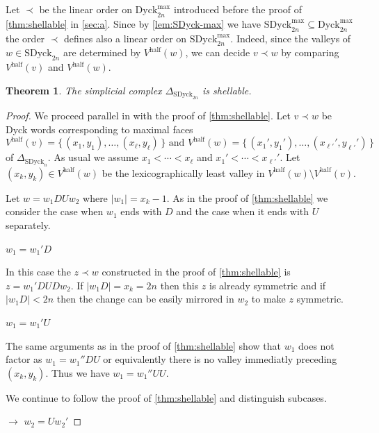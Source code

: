 \documentclass[11pt]{amsart}
\def\Dyck{\mathrm{Dyck}}
\def\half{\mathrm{half}}
\def\SDyck{\mathrm{SDyck}}
\theoremstyle{plain}
\numberwithin{lemma}{\DefaultNumberTheoremWithin}
\newtheorem{theorem}{Theorem}
\numberwithin{theorem}{\DefaultNumberTheoremWithin}
\numberwithin{corollary}{\DefaultNumberTheoremWithin}
\numberwithin{proposition}{\DefaultNumberTheoremWithin}
\numberwithin{conjecture}{\DefaultNumberTheoremWithin}
\theoremstyle{definition}
\numberwithin{definition}{\DefaultNumberTheoremWithin}
\numberwithin{question}{\DefaultNumberTheoremWithin}
\numberwithin{problem}{\DefaultNumberTheoremWithin}
\theoremstyle{remark}
\numberwithin{remark}{\DefaultNumberTheoremWithin}
\numberwithin{example}{\DefaultNumberTheoremWithin}
\numberwithin{claim}{\DefaultNumberTheoremWithin}
\begin{document}
Let $\prec$ be the linear order on $\Dyck_{2n}^{\max}$ introduced before the
proof of \ref{thm:shellable} in \ref{sec:a}. Since by \ref{lem:SDyck-max} we have
$\SDyck_{2n}^{\max} \subseteq \Dyck_{2n}^{\max}$ the order $\prec$ defines
also a linear order on $\SDyck_{2n}^ {\max}$. Indeed, since the 
valleys of $w \in \SDyck_{2n}$ are determined by $V^{\half}(w)$, 
we can decide $v \prec w$ by comparing $V^{\half}(v)$ and $V^ {\half}(w)$. 



\begin{theorem}\label{thm:SDyck-shellable} 
The simplicial complex $\Delta_{\SDyck_{2n}}$ is shellable. \end{theorem} 
\begin{proof} 
We proceed parallel in with the proof of \ref{thm:shellable}.
  Let $v \prec w$ be Dyck words corresponding to maximal faces
    \[V^{\half}(v) = \big\{\,(x_1,y_1),\dots,(x_\ell,y_\ell)\,\big\} \text{ and } V^ {\half}(w) = \big\{\,(x_1',y_1'),\dots,(x_{\ell'}',y_{\ell'}')\,\big\} \] of $\Delta_{\SDyck_n}$. As usual we assume
    $x_1 < \cdots < x_\ell$ and $x_1' < \cdots < x_{\ell'}'$.
    Let $(x_k,y_k) \in V^{\half}(w)$ be the lexicographically least valley in 
    $V^ {\half}(w) \setminus V^{\half}(v)$. 
    
Let $w = w_1DUw_2$ where $|w_1| = x_k-1$. As in the proof of \ref{thm:shellable} we consider the case when $w_1$ ends with $D$ and the case when it ends with $U$ separately.

\medskip

     $w_1 = w_1'D$

    In this case the $z \prec w$ constructed in the proof of \ref{thm:shellable} is $z = w_1'DUDw_2$. If $|w_1D| = x_k = 2n$ then this
    $z$ is already symmetric and if $|w_1D| <2n$ then the change can be
    easily mirrored in $w_2$ to make $z$ symmetric.

\medskip

     $w_1 = w_1'U$

    The same arguments as in the proof of \ref{thm:shellable} 
    show that $w_1$ does not factor as $w_1 = w_1'' DU$ or equivalently there is no valley immediatly preceding $(x_k,y_k)$. 
    Thus we have $w_1 = w_1''UU$. 
    
    We continue to follow the proof of \ref{thm:shellable} and distinguish
    subcases.

    \medskip

    $\rightarrow$ $w_2 = Uw_2'$


\end{proof}
\end{document}
